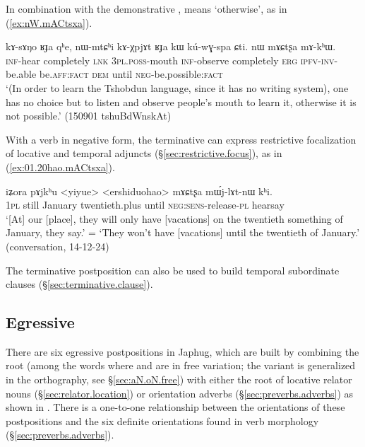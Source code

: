 In combination with the demonstrative ,  means `otherwise', as in (\ref{ex:nW.mACtsxa}).

\begin{exe}
\ex \label{ex:nW.mACtsxa}
 \gll   kɤ-sɤŋo ʁɟa qʰe,  nɯ-mtɕʰi kɤ-χpjɤt ʁɟa kɯ kú-wɣ-spa ɕti.  nɯ mɤɕtʂa mɤ-kʰɯ. \\
 \textsc{inf}-hear completely \textsc{lnk} \textsc{3pl}.\textsc{poss}-mouth \textsc{inf}-observe completely \textsc{erg} \textsc{ipfv}-\textsc{inv}-be.able be.\textsc{aff}:\textsc{fact} \textsc{dem} until \textsc{neg}-be.possible:\textsc{fact} \\
\glt `(In order to learn the Tshobdun language, since it has no writing system), one has no choice but to listen and observe people's mouth to learn it, otherwise it is not possible.' (150901 tshuBdWnskAt)
\end{exe}

With a verb in negative form, the terminative can express restrictive focalization of locative and temporal adjuncts (§\ref{sec:restrictive.focus}), as in (\ref{ex:01.20hao.mACtsxa}).

\begin{exe}
\ex \label{ex:01.20hao.mACtsxa}
 \gll  iʑora pɤjkʰu <yiyue> <ershiduohao> mɤɕtʂa mɯ́j-lɤt-nɯ kʰi. \\
 \textsc{1pl} still January twentieth.plus until \textsc{neg}:\textsc{sens}-release-\textsc{pl} hearsay \\
 \glt `[At] our [place], they will only have [vacations] on the twentieth something of January, they say.' = `They won't have [vacations] until the twentieth of January.' (conversation, 14-12-24)
 \end{exe}
 
The terminative postposition  can also be used to build temporal subordinate clauses (§\ref{sec:terminative.clause}).

\subsection{Egressive} \label{sec:egressive}
There are six egressive postpositions in Japhug, which are built by combining the root  (among the words where  and  are in free variation; the variant  is generalized in the orthography,  see §\ref{sec:aN.oN.free}) with either the root of locative relator nouns (§\ref{sec:relator.location}) or orientation adverbs (§\ref{sec:preverbs.adverbs}) as shown in . There is a one-to-one relationship between the orientations of these postpositions and the six definite orientations found in verb morphology (§\ref{sec:preverbs.adverbs}).

